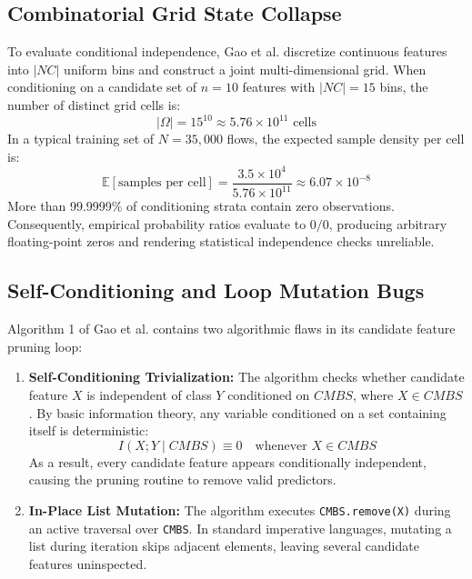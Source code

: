 \documentclass[10pt,journal,compsoc]{IEEEtran}
\begin{document}
\subsection{Combinatorial Grid State Collapse}
To evaluate conditional independence, Gao et al. discretize continuous features into $|NC|$ uniform bins and construct a joint multi-dimensional grid. When conditioning on a candidate set of $n = 10$ features with $|NC| = 15$ bins, the number of distinct grid cells is:
\begin{equation}
|\Omega| = 15^{10} \approx 5.76 \times 10^{11} \text{ cells}
\end{equation}
In a typical training set of $N = 35,000$ flows, the expected sample density per cell is:
\begin{equation}
\mathbb{E}[\text{samples per cell}] = \frac{3.5 \times 10^4}{5.76 \times 10^{11}} \approx 6.07 \times 10^{-8}
\end{equation}
More than 99.9999\% of conditioning strata contain zero observations. Consequently, empirical probability ratios evaluate to $0/0$, producing arbitrary floating-point zeros and rendering statistical independence checks unreliable.

\subsection{Self-Conditioning and Loop Mutation Bugs}
Algorithm 1 of Gao et al. contains two algorithmic flaws in its candidate feature pruning loop:
\begin{enumerate}
    \item \textbf{Self-Conditioning Trivialization:} The algorithm checks whether candidate feature $X$ is independent of class $Y$ conditioned on $CMBS$, where $X \in CMBS$. By basic information theory, any variable conditioned on a set containing itself is deterministic:
    \begin{equation}
    I(X; Y \mid CMBS) \equiv 0 \quad \text{whenever } X \in CMBS
    \end{equation}
    As a result, every candidate feature appears conditionally independent, causing the pruning routine to remove valid predictors.
    \item \textbf{In-Place List Mutation:} The algorithm executes \texttt{CMBS.remove(X)} during an active traversal over \texttt{CMBS}. In standard imperative languages, mutating a list during iteration skips adjacent elements, leaving several candidate features uninspected.
\end{enumerate}
\end{document}

